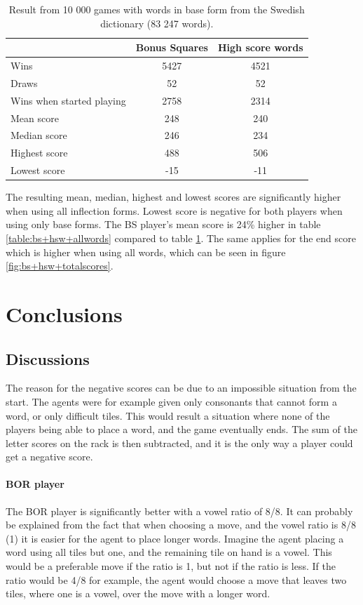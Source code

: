 \documentclass[a4paper, 12pt]{report}
\begin{document}
\begin{table}[h]
\centering
    \begin{tabular}{ l | c | c }
   	& Bonus Squares & High score words \\
   	\hline
   	Wins & 5427 & 4521 \\
   	Draws & 52 & 52 \\
	Wins when started playing & 2758 & 2314 \\   	
	Mean score & 248 & 240 \\
	Median score & 246 & 234 \\	 	 
	Highest score & 488 & 506 \\
	Lowest score & -15 & -11 \\		
    \end{tabular}
\caption{Result from 10 000 games with words in base form from the Swedish dictionary (83 247 words).}
\label{table:bs+hsw+baseforms}
\end{table}

The resulting mean, median, highest and lowest scores are significantly higher when using all inflection forms. Lowest score is negative for both players when using only base forms. The BS player's mean score is 24\% higher in table \ref{table:bs+hsw+allwords} compared to table \ref{table:bs+hsw+baseforms}. The same applies for the end score which is higher when using all words, which can be seen in figure \ref{fig:bs+hsw+totalscores}.




\chapter{Conclusions}
\section{Discussions}
The reason for the negative scores can be due to an impossible situation from the start. The agents were for example given only consonants that cannot form a word, or only difficult tiles. This would result a situation where none of the players being able to place a word, and the game eventually ends. The sum of the letter scores on the rack is then subtracted, and it is the only way a player could get a negative score.

\subsubsection{BOR player}
The BOR player is significantly better with a vowel ratio of 8/8. It can probably be explained from the fact that when choosing a move, and the vowel ratio is 8/8 (1) it is easier for the agent to place longer words. Imagine the agent placing a word using all tiles but one, and the remaining tile on hand is a vowel. This would be a preferable move if the ratio is 1, but not if the ratio is less. If the ratio would be 4/8 for example, the agent would choose a move that leaves two tiles, where one is a vowel, over the move with a longer word. 
\end{document}

